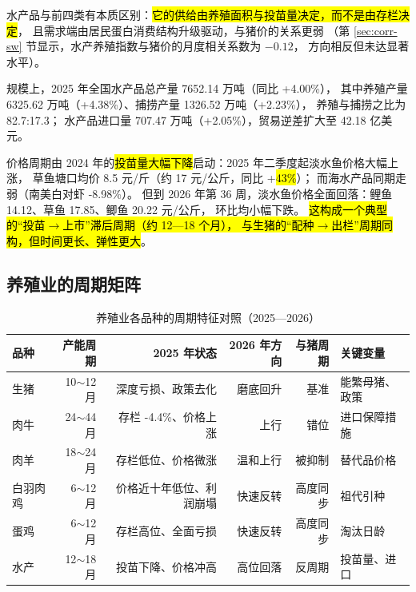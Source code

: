 水产品与前四类有本质区别：\hl{它的供给由养殖面积与投苗量决定，而不是由存栏决定}，
且需求端由居民蛋白消费结构升级驱动，与猪价的关系更弱
（第 \ref{sec:corr-sw} 节显示，水产养殖指数与猪价的月度相关系数为 $-0.12$，
方向相反但未达显著水平）。

规模上，2025 年全国水产品总产量 7652.14 万吨（同比 +4.00\%），
其中养殖产量 6325.62 万吨（+4.38\%）、捕捞产量 1326.52 万吨（+2.23\%），
养殖与捕捞之比为 82.7:17.3\cite{moa2026fishery}；
水产品进口量 707.47 万吨（+2.05\%），贸易逆差扩大至 42.18 亿美元\cite{moa2026fishery}。

价格周期由 2024 年的\hl{投苗量大幅下降}启动：2025 年二季度起淡水鱼价格大幅上涨，
草鱼塘口均价 8.5 元/斤（约 17 元/公斤，同比 +\hl{43\%}）\cite{nfnews2025grasscarp}；
而海水产品同期走弱（南美白对虾 -8.98\%）\cite{caas2026agri}。
但到 2026 年第 36 周，淡水鱼价格全面回落：鲤鱼 14.12、草鱼 17.85、鲫鱼 20.22 元/公斤，
环比均小幅下跌\cite{xinhua2026week}。
\hl{这构成一个典型的“投苗$\to$上市”滞后周期（约 12---18 个月），
与生猪的“配种$\to$出栏”周期同构，但时间更长、弹性更大}。

\subsection{养殖业的周期矩阵}
\label{sec:other-matrix}

\begin{table}[htbp]
\centering
\small
\caption{养殖业各品种的周期特征对照（2025---2026）}
\label{tab:other-livestock-matrix}
\begin{tabular}{@{}lrrrrl@{}}\toprule
品种 & 产能周期 & 2025 年状态 & 2026 年方向 & 与猪周期 & 关键变量 \\
\midrule
生猪   & 10$\sim$12 月 & 深度亏损、政策去化 & 磨底回升 & 基准      & 能繁母猪、政策 \\
肉牛   & 24$\sim$44 月 & 存栏 -4.4\%、价格上涨 & 上行      & 错位      & 进口保障措施 \\
肉羊   & 18$\sim$24 月 & 存栏低位、价格微涨 & 温和上行  & 被抑制    & 替代品价格 \\
白羽肉鸡 & 6$\sim$12 月 & 价格近十年低位、利润崩塌 & 快速反转 & 高度同步  & 祖代引种 \\
蛋鸡   & 6$\sim$12 月 & 存栏高位、全面亏损 & 快速反转  & 高度同步  & 淘汰日龄 \\
水产   & 12$\sim$18 月 & 投苗下降、价格冲高 & 高位回落  & 反周期    & 投苗量、进口 \\
\bottomrule
\end{tabular}
\end{table}

